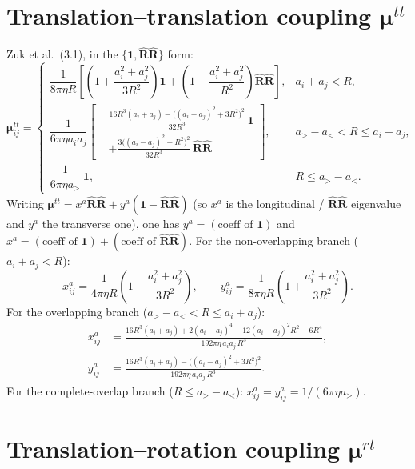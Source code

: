 \documentclass[11pt]{article}
\newcommand{\Rh}{\hat{\mathbf{R}}}
\newcommand{\one}{\mathbf{1}}
\begin{document}
\section{Translation--translation coupling \texorpdfstring{$\bm{\mu}^{tt}$}{mu-tt}}

Zuk et al.\ (3.1), in the $\{\one,\Rh\Rh\}$ form:
\begin{equation}
\bm{\mu}^{tt}_{ij}=
\begin{cases}
\dfrac{1}{8\pi\eta R}\!\left[\left(1+\dfrac{a_i^2+a_j^2}{3R^2}\right)\one
+\left(1-\dfrac{a_i^2+a_j^2}{R^2}\right)\Rh\Rh\right], & a_i+a_j<R,\\[14pt]
\dfrac{1}{6\pi\eta a_i a_j}\!\left[\begin{aligned}
&\tfrac{16R^3(a_i+a_j)-\big((a_i-a_j)^2+3R^2\big)^2}{32R^3}\,\one\\[2pt]
&+\tfrac{3\big((a_i-a_j)^2-R^2\big)^2}{32R^3}\,\Rh\Rh
\end{aligned}\right], & a_>-a_<<R\le a_i+a_j,\\[20pt]
\dfrac{1}{6\pi\eta a_>}\,\one, & R\le a_>-a_<.
\end{cases}
\end{equation}
Writing $\bm{\mu}^{tt}=x^a\Rh\Rh+y^a(\one-\Rh\Rh)$ (so $x^a$ is the longitudinal /
$\Rh\Rh$ eigenvalue and $y^a$ the transverse one), one has $y^a=(\text{coeff of }\one)$ and
$x^a=(\text{coeff of }\one)+(\text{coeff of }\Rh\Rh)$.  For the non-overlapping branch
($a_i+a_j<R$):
\begin{equation}
\boxed{\;
x^a_{ij}=\frac{1}{4\pi\eta R}\left(1-\frac{a_i^2+a_j^2}{3R^2}\right),
\qquad
y^a_{ij}=\frac{1}{8\pi\eta R}\left(1+\frac{a_i^2+a_j^2}{3R^2}\right).\;}
\end{equation}
For the overlapping branch ($a_>-a_<<R\le a_i+a_j$):
\begin{equation}
\boxed{\;
\begin{aligned}
x^a_{ij}&=\frac{16R^3(a_i+a_j)+2(a_i-a_j)^4-12(a_i-a_j)^2R^2-6R^4}{192\pi\eta\, a_i a_j\,R^3},\\[6pt]
y^a_{ij}&=\frac{16R^3(a_i+a_j)-\big((a_i-a_j)^2+3R^2\big)^2}{192\pi\eta\, a_i a_j\,R^3}.
\end{aligned}\;}
\end{equation}
For the complete-overlap branch ($R\le a_>-a_<$): $x^a_{ij}=y^a_{ij}=1/(6\pi\eta a_>)$.

\section{Translation--rotation coupling \texorpdfstring{$\bm{\mu}^{rt}$}{mu-rt}}
\end{document}
